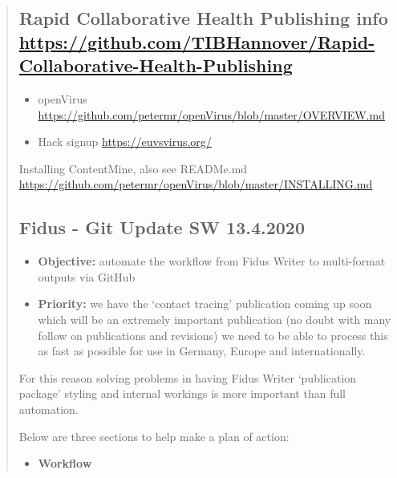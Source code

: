 \documentclass{article}
\begin{document}
\begin{quote}



\subsection{Rapid Collaborative Health Publishing info \href{https://github.com/TIBHannover/Rapid-Collaborative-Health-Publishing}{https://github.com/TIBHannover/Rapid-Collaborative-Health-Publishing}}\label{H1636129}


\begin{itemize}
\item openVirus \href{https://github.com/petermr/openVirus/blob/master/OVERVIEW.md}{https://github.com/petermr/openVirus/blob/master/OVERVIEW.md}


\item Hack signup \href{https://euvsvirus.org/}{https://euvsvirus.org/}


\end{itemize}

Installing ContentMine, also see READMe.md \href{https://github.com/petermr/openVirus/blob/master/INSTALLING.md}{https://github.com/petermr/openVirus/blob/master/INSTALLING.md}


\subsection{\textbf{Fidus - Git Update SW 13.4.2020}}\label{H3101768}


\begin{itemize}
\item \textbf{Objective:} automate the workflow from Fidus Writer to multi-format outputs via GitHub


\item \textbf{Priority:} we have the ‘contact tracing’ publication coming up soon which will be an extremely important publication (no doubt with many follow on publications and revisions) we need to be able to process this as fast as possible for use in Germany, Europe and internationally. 


\end{itemize}

For this reason solving problems in having Fidus Writer ‘publication package’ styling and internal workings is more important than full automation.


Below are three sections to help make a plan of action:

\begin{itemize}
\item \textbf{Workflow}



\end{itemize}
\end{quote}
\end{document}
